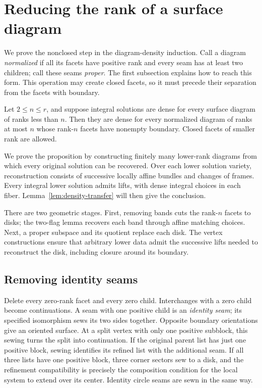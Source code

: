\section{Reducing the rank of a surface diagram}
\label{sec:reduction}

We prove the nonclosed step in the diagram-density induction.  Call a
diagram \emph{normalized} if all its facets have positive rank and every
seam has at least two children; call these seams \emph{proper}.
The first subsection explains how to reach this form.  This operation
may create closed facets, so it must precede their separation from the
facets with boundary.

\begin{proposition}\label{prop:nonclosed-reduction}
Let $2\leq n\leq r$, and suppose integral solutions are dense for every
surface diagram of ranks less than $n$.  Then they are dense for every
normalized diagram of ranks at most $n$ whose rank-$n$ facets have
nonempty boundary.  Closed facets of smaller rank are allowed.
\end{proposition}

We prove the proposition by constructing finitely many lower-rank
diagrams from which every original solution can be recovered.  Over
each lower solution variety, reconstruction consists of successive
locally affine bundles and changes of frames.  Every integral lower
solution admits lifts, with dense integral choices in each fiber.
Lemma~\ref{lem:density-transfer} will then give the conclusion.

There are two geometric stages.  First, removing bands cuts the
rank-$n$ facets to disks; the two-flag lemma recovers each band through
affine matching choices.  Next, a proper subspace and its quotient
replace each disk.  The vertex constructions ensure that arbitrary
lower data admit the successive lifts needed to reconstruct the disk,
including closure around its boundary.

\subsection{Removing identity seams}
\label{subsec:identity-normalization}

Delete every zero-rank facet and every zero child.  Interchanges with
a zero child become continuations.  A seam with one positive child
is an \emph{identity seam}; its specified isomorphism sews its two
sides together.  Opposite boundary orientations give an oriented
surface.  At a split vertex with only one positive subblock, this
sewing turns the split into continuation.  If the original parent
list has just one positive block, sewing identifies its refined
list with the additional seam.  If all three lists have one positive
block, three corner sectors sew to a disk, and the refinement
compatibility is precisely the composition condition for the local
system to extend over its center.  Identity circle seams are sewn
in the same way.

